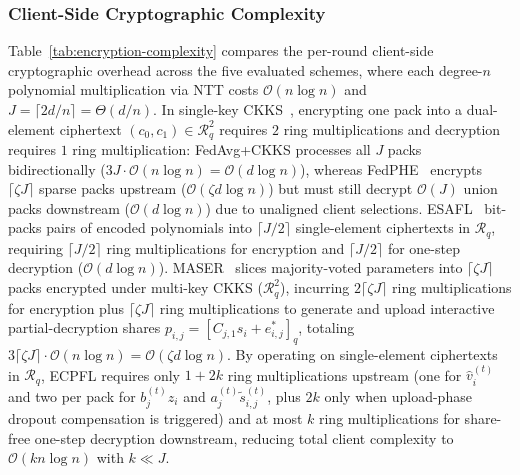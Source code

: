 \subsubsection{Client-Side Cryptographic Complexity}
Table~\ref{tab:encryption-complexity} compares the per-round client-side cryptographic overhead across the five evaluated schemes, where each degree-$n$ polynomial multiplication via NTT costs $\mathcal{O}(n\log n)$ and $J = \lceil 2d/n \rceil = \Theta(d/n)$. In single-key CKKS~\cite{cheon2017homomorphic}, encrypting one pack into a dual-element ciphertext $(c_0, c_1) \in \mathcal{R}_q^2$ requires $2$ ring multiplications and decryption requires $1$ ring multiplication: FedAvg+CKKS processes all $J$ packs bidirectionally ($3J \cdot \mathcal{O}(n\log n) = \mathcal{O}(d\log n)$), whereas FedPHE~\cite{li2025fedphe} encrypts $\lceil \zeta J \rceil$ sparse packs upstream ($\mathcal{O}(\zeta d\log n)$) but must still decrypt $\mathcal{O}(J)$ union packs downstream ($\mathcal{O}(d\log n)$) due to unaligned client selections. ESAFL~\cite{wu2025esafl} bit-packs pairs of encoded polynomials into $\lceil J/2 \rceil$ single-element ciphertexts in $\mathcal{R}_q$, requiring $\lceil J/2 \rceil$ ring multiplications for encryption and $\lceil J/2 \rceil$ for one-step decryption ($\mathcal{O}(d\log n)$). MASER~\cite{al2025maser} slices majority-voted parameters into $\lceil \zeta J \rceil$ packs encrypted under multi-key CKKS ($\mathcal{R}_q^2$), incurring $2\lceil \zeta J \rceil$ ring multiplications for encryption plus $\lceil \zeta J \rceil$ ring multiplications to generate and upload interactive partial-decryption shares $p_{i,j} = [C_{j,1} s_i + e_{i,j}^*]_q$, totaling $3\lceil \zeta J \rceil \cdot \mathcal{O}(n\log n) = \mathcal{O}(\zeta d\log n)$. By operating on single-element ciphertexts in $\mathcal{R}_q$, \textsc{ECPFL} requires only $1+2k$ ring multiplications upstream (one for $\hat{v}_i^{(t)}$ and two per pack for $b_j^{(t)}z_i$ and $a_j^{(t)}\tilde{s}_{i,j}^{(t)}$, plus $2k$ only when upload-phase dropout compensation is triggered) and at most $k$ ring multiplications for share-free one-step decryption downstream, reducing total client complexity to $\mathcal{O}(k n\log n)$ with $k \ll J$.


